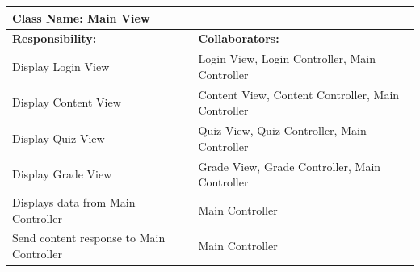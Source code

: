 \documentclass[]{article}
\begin{document}
	
	\begin{table}[H]
	\centering
		\begin{tabular}{|p{9cm}|p{3cm}|}
		\hline
		 \multicolumn{2}{|l|}{\textbf{Class Name: Main View}} \\
		\hline
		\textbf{Responsibility:} & \textbf{Collaborators:} \\
		\hline
	    Display Login View & Login View, Login Controller, Main Controller\\
		\hline
		Display Content View & Content View, Content Controller, Main Controller 	\\
		\hline
		Display Quiz View & Quiz View, Quiz Controller, Main Controller\\
		\hline
		Display Grade View & Grade View, Grade Controller, Main Controller\\
		\hline 
		Displays data from Main Controller & Main Controller\\
		\hline
		Send content response to Main Controller & Main Controller\\
		\hline
		\end{tabular}
	\end{table}	
	
\end{document}
